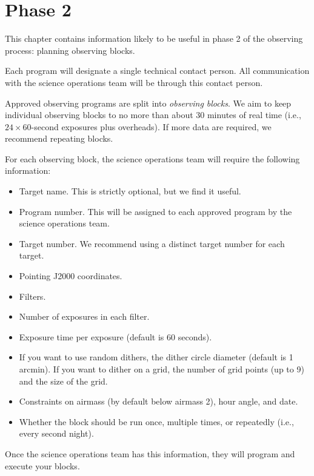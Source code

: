 \chapter{Phase 2}
\label{chapter:phase-2}

This chapter contains information likely to be useful in phase 2 of the observing process: planning observing blocks.

Each program will designate a single technical contact person. All communication with the science operations team will be through this contact person.

Approved observing programs are split into \emph{observing blocks}. We aim to keep individual observing blocks to no more than about 30 minutes of real time (i.e., $24 \times 60$-second exposures plus overheads). If more data are required, we recommend repeating blocks.

For each observing block, the science operations team will require the following information:

\begin{itemize}
\item Target name. This is strictly optional, but we find it useful.
\item Program number. This will be assigned to each approved program by the science operations team.
\item Target number. We recommend using a distinct target number for each target.
\item Pointing J2000 coordinates.
\item Filters.
\item Number of exposures in each filter.
\item Exposure time per exposure (default is 60 seconds).
\item If you want to use random dithers, the dither circle diameter (default is 1 arcmin). If you want to dither on a grid, the number of grid points (up to 9) and the size of the grid.
\item Constraints on airmass (by default below airmass 2), hour angle, and date.
\item Whether the block should be run once, multiple times, or repeatedly (i.e., every second night).
\end{itemize}

Once the science operations team has this information, they will program and execute your blocks.

